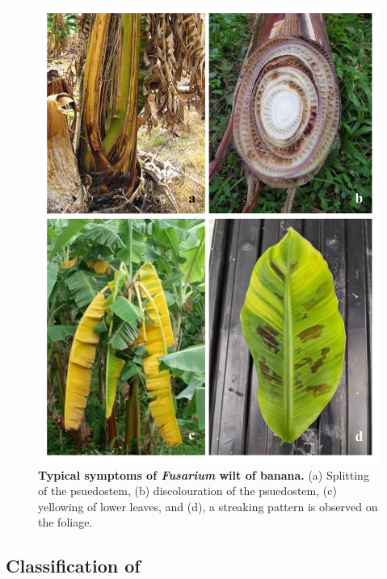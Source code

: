 \begin{figure}[hpt!]
    \centering
    \includegraphics[width=15cm]{Figures/SymptomsofFoc.pdf}
    \caption[Typical symptoms of Fusarium  wilt of banana.]{\textbf{Typical symptoms of \textit{Fusarium} wilt of banana.} (a) Splitting of the psuedostem, (b) discolouration of the psuedostem, (c) yellowing of lower leaves, and (d), a streaking pattern is observed on the foliage.}
    \label{fig:FusariumWiltSymptoms}
\end{figure}

\subsection{Classification of \Focub}

